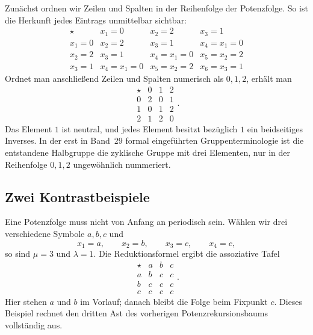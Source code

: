 \documentclass[main.tex]{subfiles}
\begin{document}
Zunächst ordnen wir Zeilen und Spalten in der Reihenfolge der Potenzfolge.
So ist die Herkunft jedes Eintrags unmittelbar sichtbar:
\[
\boxed{
\begin{array}{c|ccc}
\star&x_1=0&x_2=2&x_3=1\\\hline
x_1=0&x_2=2&x_3=1&x_4=x_1=0\\
x_2=2&x_3=1&x_4=x_1=0&x_5=x_2=2\\
x_3=1&x_4=x_1=0&x_5=x_2=2&x_6=x_3=1
\end{array}}
\]
Ordnet man anschließend Zeilen und Spalten numerisch als \(0,1,2\), erhält
man
\[
\begin{array}{c|ccc}
\star&0&1&2\\\hline
0&2&0&1\\
1&0&1&2\\
2&1&2&0
\end{array}.
\]
Das Element \(1\) ist neutral, und jedes Element besitzt bezüglich \(1\) ein
beidseitiges Inverses.  In der erst in Band~29 formal eingeführten
Gruppenterminologie ist die entstandene Halbgruppe die zyklische Gruppe mit
drei Elementen, nur in der Reihenfolge \(0,1,2\) ungewöhnlich nummeriert.


\subsection{Zwei Kontrastbeispiele}

Eine Potenzfolge muss nicht von Anfang an periodisch sein.  Wählen wir drei
verschiedene Symbole \(a,b,c\) und
\[
  x_1=a,\qquad x_2=b,\qquad x_3=c,\qquad x_4=c,
\]
so sind \(\mu=3\) und \(\lambda=1\).  Die Reduktionsformel ergibt die
assoziative Tafel
\[
\begin{array}{c|ccc}
\star&a&b&c\\\hline
a&b&c&c\\
b&c&c&c\\
c&c&c&c
\end{array}.
\]
Hier stehen \(a\) und \(b\) im Vorlauf; danach bleibt die Folge beim
Fixpunkt \(c\).  Dieses Beispiel rechnet den dritten Ast des vorherigen
Potenzrekursionsbaums vollständig aus.
\end{document}

